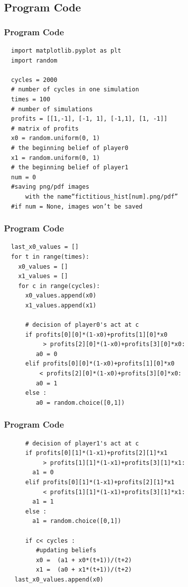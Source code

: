 \documentclass[dvipdfmx,11pt]{beamer}
\begin{document}
\subsection{Program Code}
\begin{frame}[containsverbatim]\frametitle{Program Code}
 \begin{verbatim}
  import matplotlib.pyplot as plt
  import random
  
  cycles = 2000
  # number of cycles in one simulation
  times = 100
  # number of simulations
  profits = [[1,-1], [-1, 1], [-1,1], [1, -1]]
  # matrix of profits
  x0 = random.uniform(0, 1)
  # the beginning belief of player0
  x1 = random.uniform(0, 1)
  # the beginning belief of player1
  num = 0
  #saving png/pdf images
      with the name“fictitious_hist[num].png/pdf”
  #if num = None, images won’t be saved
 \end{verbatim}
\end{frame}

\begin{frame}[containsverbatim]\frametitle{Program Code}
 \begin{verbatim}
  last_x0_values = []
  for t in range(times):
    x0_values = []
    x1_values = []
    for c in range(cycles):
      x0_values.append(x0)
      x1_values.append(x1)
      
      # decision of player0's act at c
      if profits[0][0]*(1-x0)+profits[1][0]*x0 
           > profits[2][0]*(1-x0)+profits[3][0]*x0:
         a0 = 0
      elif profits[0][0]*(1-x0)+profits[1][0]*x0
          < profits[2][0]*(1-x0)+profits[3][0]*x0:
         a0 = 1
      else :
         a0 = random.choice([0,1])
 \end{verbatim}
\end{frame}

\begin{frame}[containsverbatim]\frametitle{Program Code}
 \begin{verbatim}
      # decision of player1's act at c
      if profits[0][1]*(1-x1)+profits[2][1]*x1
           > profits[1][1]*(1-x1)+profits[3][1]*x1:
        a1 = 0
      elif profits[0][1]*(1-x1)+profits[2][1]*x1
           < profits[1][1]*(1-x1)+profits[3][1]*x1:
        a1 = 1
      else :
        a1 = random.choice([0,1])
        
      if c< cycles :
         #updating beliefs
         x0 =  (a1 + x0*(t+1))/(t+2)
         x1 =  (a0 + x1*(t+1))/(t+2)
   last_x0_values.append(x0)
 \end{verbatim}
\end{frame}
\end{document}
